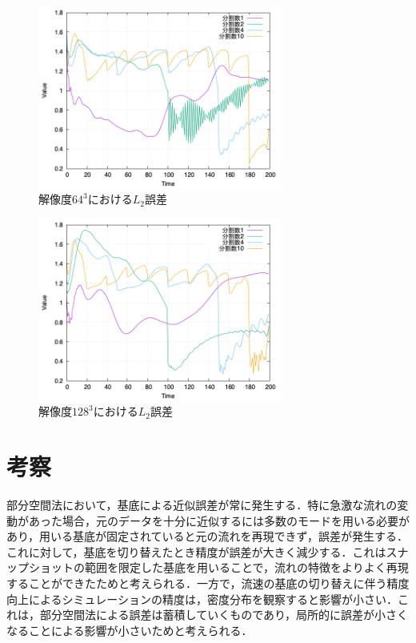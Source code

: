 \documentclass[uplatex,dvipdfmx,10pt,a4paper,notitlepage,oneside,twocolumn]{abst_jsarticle}
\begin{document}
\begin{figure}[htbp]
\centering
\includegraphics[width=80mm]{images/64error.png}
\caption{$解像度64^3におけるL_2誤差$}
\label{fig:64error}
\end{figure}

\begin{figure}[htbp]
\centering
\includegraphics[width=80mm]{images/128error.png}
\caption{$解像度128^3におけるL_2誤差$}
\label{fig:128error}
\end{figure}

\section{考察}
部分空間法において，基底による近似誤差が常に発生する．特に急激な流れの変動があった場合，元のデータを十分に近似するには多数のモードを用いる必要があり，用いる基底が固定されていると元の流れを再現できず，誤差が発生する．これに対して，基底を切り替えたとき精度が誤差が大きく減少する．これはスナップショットの範囲を限定した基底を用いることで，流れの特徴をよりよく再現することができたためと考えられる．一方で，流速の基底の切り替えに伴う精度向上によるシミュレーションの精度は，密度分布を観察すると影響が小さい．これは，部分空間法による誤差は蓄積していくものであり，局所的に誤差が小さくなることによる影響が小さいためと考えられる．
\end{document}
